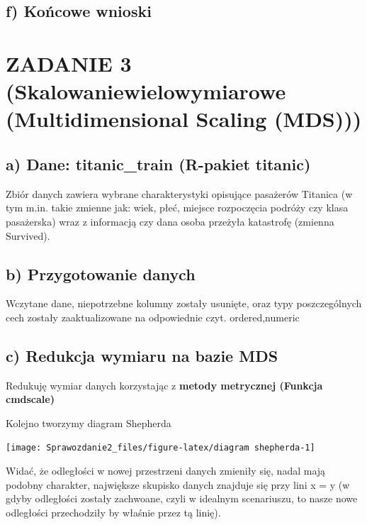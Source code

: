 \documentclass[
  12pt,
]{article}
\begin{document}
\subsection{f) Końcowe wnioski}\label{f-koux144cowe-wnioski-1}

\section{ZADANIE 3 (Skalowaniewielowymiarowe (Multidimensional Scaling
(MDS)))}\label{zadanie-3-skalowaniewielowymiarowe-multidimensional-scaling-mds}

\subsection{a) Dane: titanic\_train (R-pakiet
titanic)}\label{a-dane-titanic_train-r-pakiet-titanic}

Zbiór danych zawiera wybrane charakterystyki opisujące pasażerów
Titanica (w tym m.in. takie zmienne jak: wiek, płeć, miejsce rozpoczęcia
podróży czy klasa pasażerska) wraz z informacją czy dana osoba przeżyła
katastrofę (zmienna Survived).

\subsection{b) Przygotowanie danych}\label{b-przygotowanie-danych}

Wczytane dane, niepotrzebne kolumny zostały usunięte, oraz typy
poszczególnych cech zostały zaaktualizowane na odpowiednie czyt.
ordered,numeric

\subsection{c) Redukcja wymiaru na bazie
MDS}\label{c-redukcja-wymiaru-na-bazie-mds}

Redukuję wymiar danych korzystając z \textbf{metody metrycznej (Funkcja
cmdscale)}

Kolejno tworzymy diagram Shepherda

\begin{center}\texttt{[image: Sprawozdanie2\_files/figure-latex/diagram shepherda-1]} \end{center}

Widać, że odległości w nowej przestrzeni danych zmieniły się, nadal mają
podobny charakter, największe skupisko danych znajduje się przy lini x =
y (w gdyby odległości zostały zachwoane, czyli w idealnym scenariuszu,
to nasze nowe odległości przechodziły by właśnie przez tą linię).
\end{document}
